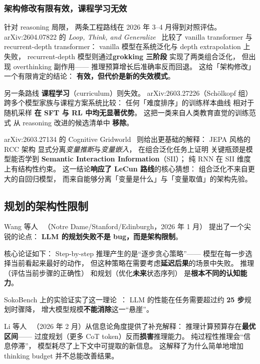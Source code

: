 \subsubsection{架构修改有限有效，课程学习无效}

针对 reasoning 局限，
两条工程路线在 2026 年 3--4 月得到对照评估。
arXiv:2604.07822 的 \emph{Loop, Think, and Generalize}~\cite{loopthink2604}
比较了 vanilla transformer 与 recurrent-depth transformer：
vanilla 模型在系统泛化与 depth extrapolation 上失败，
recurrent-depth 模型则通过\textbf{grokking 三阶段}
实现了两类组合泛化，
但出现 overthinking 副作用——
推理预算增长后准确率反而回退。
这给「架构修改」一个有限肯定的结论：
\textbf{有效，但代价是新的失效模式}。

另一条路线
\textbf{课程学习}（curriculum）则失效。
arXiv:2603.27226（Schölkopf 组）~\cite{rethinkeasyhard2603}
跨多个模型家族与课程方案系统比较：
任何「难度排序」的训练样本曲线
相对于随机采样
\textbf{在 SFT 与 RL 中均无显著优势}。
这把一类来自人类教育直觉的训练范式
从 reasoning 改进的候选清单中
\textbf{移除}。

arXiv:2603.27134 的 Cognitive Gridworld~\cite{cognitivegrid2603}
则给出更基础的解释：
JEPA 风格的 RCC 架构
显式分离\emph{变量推断}与\emph{变量嵌入}，
在组合泛化任务上证明
关键瓶颈是模型能否学到
\textbf{Semantic Interaction Information}（SII）；
纯 RNN 在 SII 维度上有结构性约束。
这一结论\textbf{响应了 LeCun 路线}的核心猜想：
组合泛化不来自更大的自回归模型，
而来自能够分离「变量是什么」与「变量取值」的架构先验。

\subsection{规划的架构性限制}

Wang 等人~\cite{wang2026whyreasoning}
（Notre Dame/Stanford/Edinburgh，2026 年 1 月）
提出了一个尖锐的论点：
\textbf{LLM 的规划失败不是 bug，而是架构限制}。

核心论证如下：
Step-by-step 推理产生的是``逐步贪心策略''——
模型在每一步选择当前看起来最好的动作，
但这种策略在需要考虑\textbf{延迟后果}的场景中失败。
推理（评估当前步骤的正确性）
和规划（优化\textbf{未来}状态序列）
是\textbf{根本不同的认知能力}。

SokoBench 上的实验证实了这一理论~\cite{monti2025sokobench}：
LLM 的性能在任务需要超过约 \textbf{25 步}规划时骤降，
增大模型规模\textbf{不能消除}这一``悬崖''。

Li 等人~\cite{li2026limitedspace}
（2026 年 2 月）从信息论角度提供了补充解释：
推理计算预算存在\textbf{最优区间}——
过度规划（更多 CoT token）反而\textbf{损害}推理能力。
纯过程性推理会``信息停滞''，
模型耗尽了上下文中可提取的新信息。
这解释了为什么简单地增加 thinking budget
并不总能改善结果。



